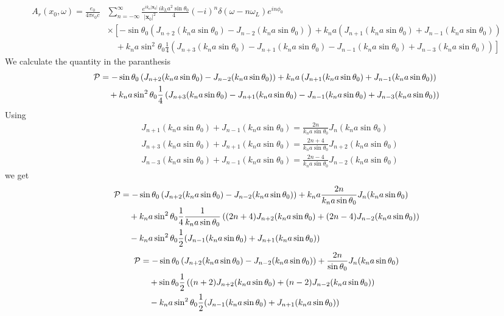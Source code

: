 \begin{align}
    A_r(x_0,\omega)=\frac{e_0 }{4\pi\epsilon_0 c} & \sum_{n=-\infty}^{\infty}\frac{e^{i k_n|{\bm x}_0|}}{|{\bm x}_0|^2}\frac{ik_La^2\sin\theta_0}4 (-i)^n \delta(\omega-n\omega_L)e^{in\phi_0}\nonumber                               \\
                                                  & \times\left[-\sin\theta_0\left(J_{n+2}(k_na\sin\theta_0)-J_{n-2}(k_na\sin\theta_0)\right)\right. +{k_na}\left(J_{n+1}(k_na\sin\theta_0)+J_{n-1}(k_na\sin\theta_0)\right)\nonumber \\
                                                  & \left. \quad+k_na\sin^2\theta_0\frac1{4}\left(J_{n+3}(k_na\sin\theta_0)-J_{n+1}(k_na\sin\theta_0)-J_{n-1}(k_na\sin\theta_0)+J_{n-3}(k_na\sin\theta_0)\right)\right]
\end{align}
We calculate the quantity in the paranthesis
\begin{align}
    {\cal P} & =-\sin\theta_0\left(J_{n+2}(k_na\sin\theta_0)-J_{n-2}(k_na\sin\theta_0)\right) +{k_na}\left(J_{n+1}(k_na\sin\theta_0)+J_{n-1}(k_na\sin\theta_0)\right)\nonumber \\
             & \quad+k_na\sin^2\theta_0\frac1{4}\left(J_{n+3}(k_na\sin\theta_0)-J_{n+1}(k_na\sin\theta_0)-J_{n-1}(k_na\sin\theta_0)+J_{n-3}(k_na\sin\theta_0)\right)
\end{align}
Using
\begin{align}
     & J_{n+1}(k_na\sin\theta_0)+J_{n-1}(k_na\sin\theta_0)=\frac{2n}{k_na\sin\theta_0}J_{n}(k_na\sin\theta_0)     \\
     & J_{n+3}(k_na\sin\theta_0)+J_{n+1}(k_na\sin\theta_0)=\frac{2n+4}{k_na\sin\theta_0}J_{n+2}(k_na\sin\theta_0) \\
     & J_{n-3}(k_na\sin\theta_0)+J_{n-1}(k_na\sin\theta_0)=\frac{2n-4}{k_na\sin\theta_0}J_{n-2}(k_na\sin\theta_0)
\end{align}
we get
\begin{align}
    {\cal P} & =-\sin\theta_0\left(J_{n+2}(k_na\sin\theta_0)-J_{n-2}(k_na\sin\theta_0)\right) +{k_na}\frac{2n}{k_na\sin\theta_0}J_n(k_na\sin\theta_0)\nonumber \\
             & \quad+k_na\sin^2\theta_0\frac1{4}\frac1{k_na\sin\theta_0}\left((2n+4)J_{n+2}(k_na\sin\theta_0)+(2n-4)J_{n-2}(k_na\sin\theta_0)\right)\nonumber  \\
             & \quad  -k_na\sin^2\theta_0\frac1{2}(J_{n-1}(k_na\sin\theta_0)+J_{n+1}(k_na\sin\theta_0))
\end{align}
\begin{align}
    {\cal P} & =-\sin\theta_0\left(J_{n+2}(k_na\sin\theta_0)-J_{n-2}(k_na\sin\theta_0)\right) +\frac{2n}{\sin\theta_0}J_n(k_na\sin\theta_0)\nonumber \\
             & \quad+\sin\theta_0\frac1{2}\left((n+2)J_{n+2}(k_na\sin\theta_0)+(n-2)J_{n-2}(k_na\sin\theta_0)\right)\nonumber                        \\
             & \quad  -k_na\sin^2\theta_0\frac1{2}(J_{n-1}(k_na\sin\theta_0)+J_{n+1}(k_na\sin\theta_0))
\end{align}
